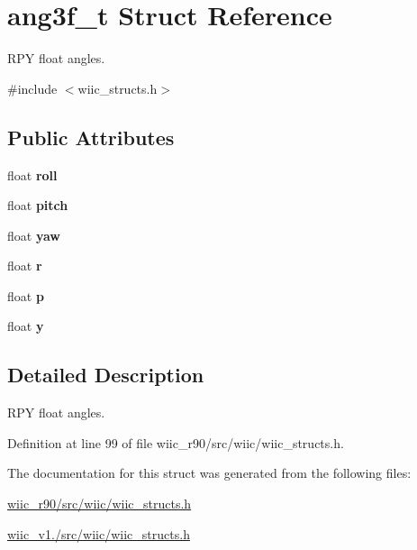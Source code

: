 \hypertarget{structang3f__t}{\section{ang3f\-\_\-t Struct Reference}
\label{structang3f__t}
}


R\-P\-Y float angles.  




{\ttfamily \#include $<$wiic\-\_\-structs.\-h$>$}

\subsection*{Public Attributes}
\begin{DoxyCompactItemize}
\item 
\hypertarget{structang3f__t_ae20d5612a396169a552d5cf1331ff44e}{float {\bfseries roll}}\label{structang3f__t_ae20d5612a396169a552d5cf1331ff44e}

\item 
\hypertarget{structang3f__t_a6b502912c6e6310980794a6659d1bb60}{float {\bfseries pitch}}\label{structang3f__t_a6b502912c6e6310980794a6659d1bb60}

\item 
\hypertarget{structang3f__t_a4aaa40b1ad6ca3477e92a40eab30f18f}{float {\bfseries yaw}}\label{structang3f__t_a4aaa40b1ad6ca3477e92a40eab30f18f}

\item 
\hypertarget{structang3f__t_a09595b789ac278dae9703697713b53a9}{float {\bfseries r}}\label{structang3f__t_a09595b789ac278dae9703697713b53a9}

\item 
\hypertarget{structang3f__t_a009fcdb7a86a7c5e54738dc23fe53443}{float {\bfseries p}}\label{structang3f__t_a009fcdb7a86a7c5e54738dc23fe53443}

\item 
\hypertarget{structang3f__t_a6f9590858061faa6ae701510664937c8}{float {\bfseries y}}\label{structang3f__t_a6f9590858061faa6ae701510664937c8}

\end{DoxyCompactItemize}


\subsection{Detailed Description}
R\-P\-Y float angles. 

Definition at line 99 of file wiic\-\_\-r90/src/wiic/wiic\-\_\-structs.\-h.



The documentation for this struct was generated from the following files\-:\begin{DoxyCompactItemize}
\item 
\hyperlink{wiic__r90_2src_2wiic_2wiic__structs_8h}{wiic\-\_\-r90/src/wiic/wiic\-\_\-structs.\-h}\item 
\hyperlink{wiic__v1_81_2src_2wiic_2wiic__structs_8h}{wiic\-\_\-v1./src/wiic/wiic\-\_\-structs.\-h}\end{DoxyCompactItemize}
